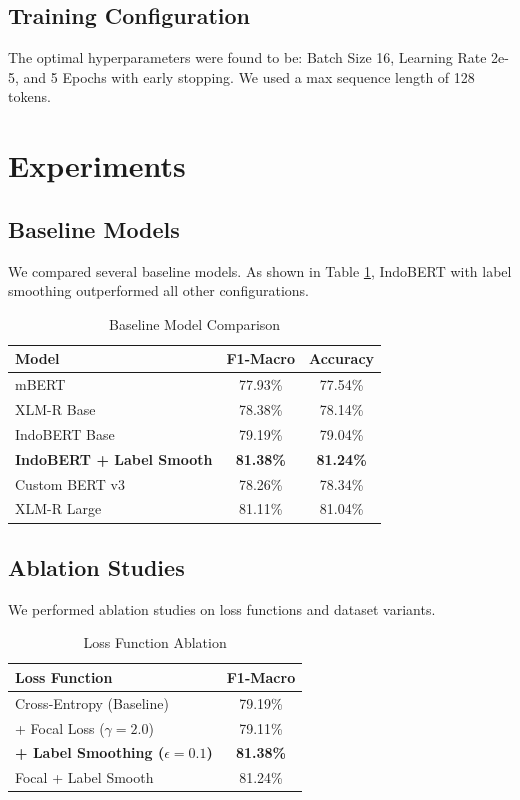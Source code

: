 \documentclass[conference]{IEEEtran}
\begin{document}
\subsection{Training Configuration}
The optimal hyperparameters were found to be: Batch Size 16, Learning Rate 2e-5, and 5 Epochs with early stopping. We used a max sequence length of 128 tokens.

\section{Experiments}

\subsection{Baseline Models}
We compared several baseline models. As shown in Table \ref{tab:baselines}, IndoBERT with label smoothing outperformed all other configurations.

\begin{table}[htbp]
\caption{Baseline Model Comparison}
\begin{center}
\begin{tabular}{lcc}
\toprule
\textbf{Model} & \textbf{F1-Macro} & \textbf{Accuracy} \\
\midrule
mBERT & 77.93\% & 77.54\% \\
XLM-R Base & 78.38\% & 78.14\% \\
IndoBERT Base & 79.19\% & 79.04\% \\
\textbf{IndoBERT + Label Smooth} & \textbf{81.38\%} & \textbf{81.24\%} \\
Custom BERT v3 & 78.26\% & 78.34\% \\
XLM-R Large & 81.11\% & 81.04\% \\
\bottomrule
\end{tabular}
\label{tab:baselines}
\end{center}
\end{table}

\subsection{Ablation Studies}
We performed ablation studies on loss functions and dataset variants.

\begin{table}[htbp]
\caption{Loss Function Ablation}
\begin{center}
\begin{tabular}{lc}
\toprule
\textbf{Loss Function} & \textbf{F1-Macro} \\
\midrule
Cross-Entropy (Baseline) & 79.19\% \\
+ Focal Loss ($\gamma=2.0$) & 79.11\% \\
\textbf{+ Label Smoothing ($\epsilon=0.1$)} & \textbf{81.38\%} \\
Focal + Label Smooth & 81.24\% \\
\bottomrule
\end{tabular}
\label{tab:ablation_loss}
\end{center}
\end{table}
\end{document}

